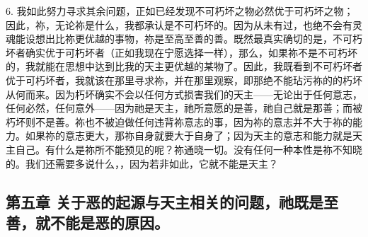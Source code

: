 6. 我如此努力寻求其余问题，正如已经发现不可朽坏之物必然优于可朽坏之物；因此，祢，无论祢是什么，我都承认是不可朽坏的。因为从未有过，也绝不会有灵魂能设想出比祢更优越的事物，祢是至高至善的善。既然最真实确切的是，不可朽坏者确实优于可朽坏者（正如我现在宁愿选择一样），那么，如果祢不是不可朽坏的，我就能在思想中达到比我的天主更优越的某物了。因此，我既看到不可朽坏者优于可朽坏者，我就该在那里寻求祢，并在那里观察，即那绝不能玷污祢的的朽坏从何而来。因为朽坏确实不会以任何方式损害我们的天主——无论出于任何意志，任何必然，任何意外——因为祂是天主，祂所意愿的是善，祂自己就是那善；而被朽坏则不是善。祢也不被迫做任何违背祢意志的事，因为祢的意志并不大于祢的能力。如果祢的意志更大，那祢自身就要大于自身了；因为天主的意志和能力就是天主自己。有什么是祢所不能预见的呢？祢通晓一切。没有任何一种本性是祢不知晓的。我们还需要多说什么，，因为若非如此，它就不能是天主？\par


\subsection{第五章 关于恶的起源与天主相关的问题，祂既是至善，就不能是恶的原因。}

